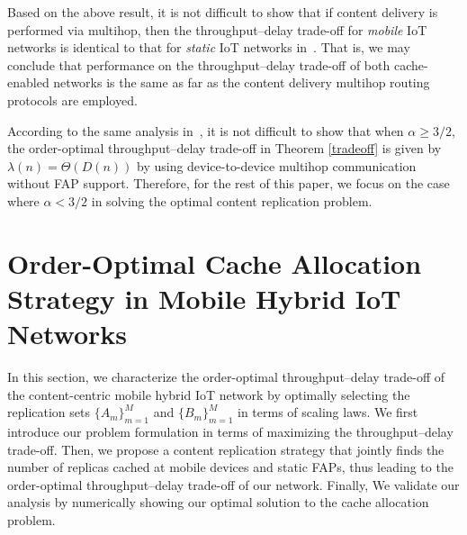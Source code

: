 \documentclass[10pt,journal,compsoc,onecolumn]{IEEEtran}
\begin{document}
\begin{remark}
Based on the above result, it is not difficult to show that if
content delivery is performed via multihop, then the
throughput--delay trade-off for \textit{mobile} IoT networks is
identical to that for \textit{static} IoT networks
in~\cite{a1}. That is, we may conclude that performance on
the throughput--delay trade-off of both cache-enabled networks is the
same as far as the content delivery multihop routing protocols are
employed.
\end{remark}

According to the same analysis in~\cite{a1}, it is not difficult to show that when $\alpha\geq 3/2$, the order-optimal
throughput--delay trade-off in Theorem \ref{tradeoff} is
given by $\lambda(n)=\Theta\left(D(n)\right)$ by using device-to-device multihop
communication without FAP support. Therefore, for the rest of this
paper, we focus on the case where $\alpha < 3/2$ in solving the
optimal content replication problem.

\section{Order-Optimal Cache Allocation Strategy in Mobile Hybrid IoT Networks} \label{joint}

In this section, we characterize the order-optimal throughput--delay
trade-off of the content-centric mobile hybrid IoT network by
optimally selecting the replication sets ${\lbrace A_m
\rbrace}^M_{m=1}$ and ${\lbrace B_m \rbrace}^M_{m=1}$ in terms of scaling laws. We first
introduce our problem formulation in terms of maximizing the
throughput--delay trade-off. Then, we propose a content
replication strategy that jointly finds the number of replicas
cached at mobile devices and static FAPs, thus leading to the order-optimal
throughput--delay trade-off of our
network. Finally, We validate our analysis by numerically showing
our optimal solution to the cache allocation problem.
\end{document}
